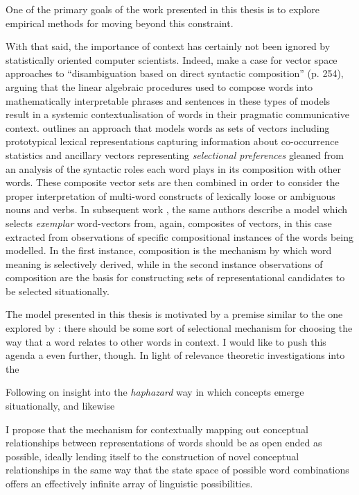 One of the primary goals of the work presented in this thesis is to explore empirical methods for moving beyond this constraint.

With that said, the importance of context has certainly not been ignored by statistically oriented computer scientists.  Indeed, \cite{BaroniEA2014b} make a case for vector space approaches to ``disambiguation based on direct syntactic composition'' (p. 254), arguing that the linear algebraic procedures used to compose words into mathematically interpretable phrases and sentences in these types of models result in a systemic contextualisation of words in their pragmatic communicative context.  \cite{ErkEA2008} outlines an approach that models words as sets of vectors including prototypical lexical representations capturing information about co-occurrence statistics and ancillary vectors representing \emph{selectional preferences} \citep[\emph{a la}][]{Wilks1978} gleaned from an analysis of the syntactic roles each word plays in its composition with other words.  These composite vector sets are then combined in order to consider the proper interpretation of multi-word constructs of lexically loose or ambiguous nouns and verbs.  In subsequent work \citep{ErkEA2010}, the same authors describe a model which selects \emph{exemplar} word-vectors from, again, composites of vectors, in this case extracted from observations of specific compositional instances of the words being modelled.  In the first instance, composition is the mechanism by which word meaning is selectively derived, while in the second instance observations of composition are the basis for constructing sets of representational candidates to be selected situationally.

The model presented in this thesis is motivated by a premise similar to the one explored by \citeauthor{ErkEA2008}: there should be some sort of selectional mechanism for choosing the way that a word relates to other words in context.  I would like to push this agenda a even further, though.  In light of relevance theoretic investigations into the 

Following on  insight into the \emph{haphazard} way in which concepts emerge situationally, and likewise 

I propose that the mechanism for contextually mapping out conceptual relationships between representations of words should be as open ended as possible, ideally lending itself to the construction of novel conceptual relationships in the same way that the state space of possible word combinations offers an effectively infinite array of linguistic possibilities.

